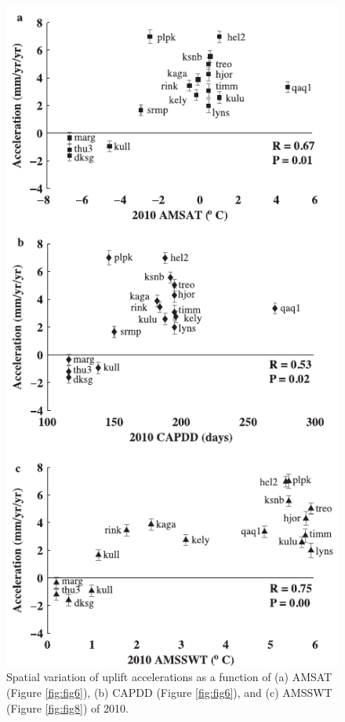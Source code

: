 \clearpage
\begin{figure}
 \centering
 \includegraphics{figs_chpt3/2012GC004432-f14.pdf} 
 \caption{Spatial variation of uplift accelerations as a function of (a) AMSAT (Figure \ref{fig:fig6}), (b) CAPDD (Figure \ref{fig:fig6}), and (c) AMSSWT (Figure \ref{fig:fig8}) of 2010.}
 \label{fig:fig14}
\end{figure}

